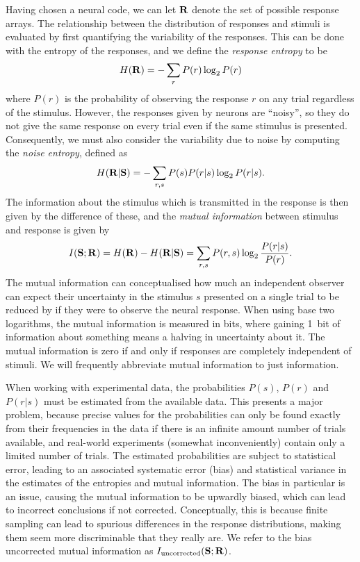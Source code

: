 Having chosen a neural code, we can let $\mathbf{R}$ denote the set of possible response arrays.
The relationship between the distribution of responses and stimuli is evaluated by first quantifying the variability of the responses.
This can be done with the entropy \citep{Shannon1948} of the responses, and we define the \textit{response entropy} to be
\begin{equation}
H( \mathbf{R} )
= - \sum_{r} P(r) \log_2 P(r)
\end{equation}
where $P(r)$ is the probability of observing the response $r$ on any trial regardless of the stimulus.
However, the responses given by neurons are ``noisy'', so they do not give the same response on every trial even if the same stimulus is presented.
Consequently, we must also consider the variability due to noise by computing the \textit{noise entropy}, defined as
\begin{equation}
H( \mathbf{R} | \mathbf{S} )
= - \sum_{r,s} P(s) P(r|s) \log_2 P(r|s)
.\end{equation}
The information about the stimulus which is transmitted in the response is then given by the difference of these, and the \textit{mutual information} between stimulus and response is given by
\begin{equation}
I( \mathbf{S} ; \mathbf{R} )
= H( \mathbf{R} ) - H( \mathbf{R} | \mathbf{S} )
= \sum_{r,s} P(r,s) \log_2 \frac{P(r|s)}{P(r)}
.\end{equation}
The mutual information can conceptualised how much an independent observer can expect their uncertainty in the stimulus $s$ presented on a single trial to be reduced by if they were to observe the neural response.
When using base two logarithms, the mutual information is measured in bits, where gaining \SI{1}{bit} of information about something means a halving in uncertainty about it.
The mutual information is zero if and only if responses are completely independent of stimuli.
We will frequently abbreviate mutual information to just information.

When working with experimental data, the probabilities $P(s)$, $P(r)$ and $P(r|s)$ must be estimated from the available data.
This presents a major problem, because precise values for the probabilities can only be found exactly from their frequencies in the data if there is an infinite amount number of trials available, and real-world experiments (somewhat inconveniently) contain only a limited number of trials.
The estimated probabilities are subject to statistical error, leading to an associated systematic error (bias) and statistical variance in the estimates of the entropies and mutual information.
The bias in particular is an issue, causing the mutual information to be upwardly biased, which can lead to incorrect conclusions if not corrected.
Conceptually, this is because finite sampling can lead to spurious differences in the response distributions, making them seem more discriminable that they really are.
We refer to the bias uncorrected mutual information as $I_{\text{uncorrected}}(\mathbf{S};\mathbf{R})$.


